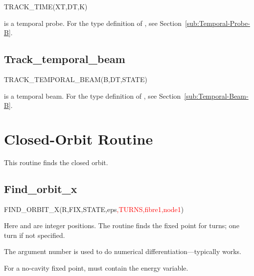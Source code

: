 %
\begin{ptccode}
TRACK_TIME(XT,DT,K)
\end{ptccode}

 is a temporal probe. For the type definition of ,
see Section~\ref{sub:Temporal-Probe-B}.


\subsection{Track\_temporal\_beam}

%
\begin{ptccode}
TRACK_TEMPORAL_BEAM(B,DT,STATE)
\end{ptccode}

 is a temporal beam. For the type definition of ,
see Section~\ref{sub:Temporal-Beam-B}.


\section{Closed-Orbit Routine}

%
This routine finds the closed orbit.


\subsection{Find\_orbit\_x}
\label{sub:Find-Orbit-X}

%
\begin{ptccode}
FIND_ORBIT_X(R,FIX,STATE,eps\textcolor{red}{,TURNS,fibre1,node1})
\end{ptccode}

Here  and  are integer positions. The routine finds the
fixed point for  turns; one turn if not specified.

The argument  number is used to do numerical
differentiation---typically  works.

For a no-cavity fixed point,  must contain the energy variable.

\endinput
